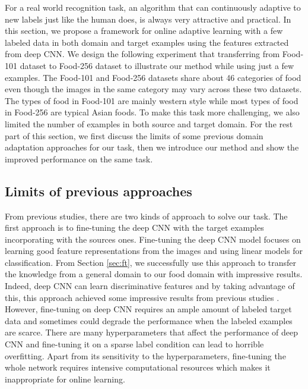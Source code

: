 ﻿For a real world recognition task, an algorithm that can continuously adaptive to new labels just like the human does, is always very attractive and practical.
In this section, we propose a framework for online adaptive learning with a few labeled data in both domain and target examples using the features extracted from deep CNN.  We design the following experiment that transferring from Food-101 dataset to Food-256 dataset to illustrate our method while using just a few examples. The Food-101 and Food-256 datasets share about 46 categories of food even though the images in the same category may vary across these two datasets. The types of food in Food-101 are mainly western style while most types of food in Food-256 are typical Asian foods. To make this task more challenging, we also limited the number of examples in both source and target domain. For the rest part of this section, we first discuss the limits of some previous domain adaptation approaches for our task, then we introduce our method and show the improved performance on the same task.
\subsection{Limits of previous approaches}
From previous studies, there are two kinds of approach to solve our task. The first approach is to fine-tuning the deep CNN with the target examples incorporating with the sources ones.
Fine-tuning the deep CNN model focuses on learning good feature representations from the images and using linear models for classification. From Section \ref{sec:ft}, we successfully use this approach to transfer the knowledge from a general domain to our food domain with impressive results. Indeed, deep CNN can learn discriminative features and by taking advantage of this, this approach achieved some impressive results from previous studies\cite{Chatfield14} \cite{zeiler2014visualizing}. However, fine-tuning on deep CNN requires an ample amount of labeled target data and sometimes could degrade the performance when the labeled examples are scarce\cite{hoffman2013one}. There are many hyperparameters that affect the performance of deep CNN and fine-tuning it on a sparse label condition can lead to horrible overfitting. Apart from its sensitivity to the hyperparameters, fine-tuning the whole network requires intensive computational resources which makes it inappropriate for online learning.

